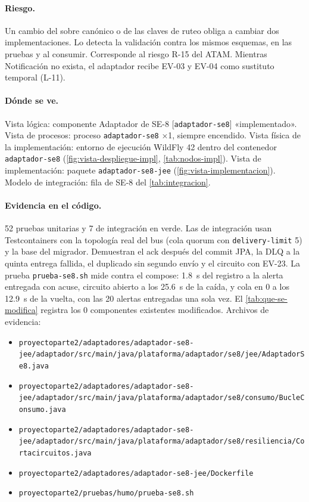 \paragraph{Riesgo.} Un cambio del sobre canónico o de las claves de ruteo obliga a cambiar dos implementaciones. Lo detecta la validación contra los mismos esquemas, en las pruebas y al consumir. Corresponde al riesgo R-15 del ATAM.
Mientras Notificación no exista, el adaptador recibe EV-03 y EV-04 como sustituto temporal (L-11).

\paragraph{Dónde se ve.} Vista lógica: componente Adaptador de SE-8 [\texttt{adaptador-se8}] «implementado».
Vista de procesos: proceso \texttt{adaptador-se8} ×1, siempre encendido.
Vista física de la implementación: entorno de ejecución WildFly 42 dentro del contenedor \texttt{adaptador-se8} (\cref{fig:vista-despliegue-impl}, \cref{tab:nodos-impl}).
Vista de implementación: paquete \texttt{adaptador-\br{}se8-\br{}jee} (\cref{fig:vista-implementacion}).
Modelo de integración: fila de SE-8 del \cref{tab:integracion}.

\paragraph{Evidencia en el código.} 52 pruebas unitarias y 7 de integración en verde. Las de integración usan Testcontainers con la topología real del bus (cola quorum con \texttt{delivery-limit} 5) y la base del migrador. Demuestran el ack después del commit JPA, la DLQ a la quinta entrega fallida, el duplicado sin segundo envío y el circuito con EV-23.
La prueba \texttt{prueba-se8.sh} mide contra el compose: \qty{1,8}{\second} del registro a la alerta entregada con acuse, circuito abierto a los \qty{25,6}{\second} de la caída, y cola en 0 a los \qty{12,9}{\second} de la vuelta, con las 20 alertas entregadas una sola vez.
El \cref{tab:que-se-modifica} registra los 0 componentes existentes modificados.
Archivos de evidencia:
{\raggedright
\begin{itemize}
  \item \texttt{proyectoparte2/\br{}adaptadores/\br{}adaptador-se8-jee/\br{}adaptador/\br{}src/\br{}main/\br{}java/\br{}plataforma/\br{}adaptador/\br{}se8/\br{}jee/\br{}AdaptadorSe8.java}
  \item \texttt{proyectoparte2/\br{}adaptadores/\br{}adaptador-se8-jee/\br{}adaptador/\br{}src/\br{}main/\br{}java/\br{}plataforma/\br{}adaptador/\br{}se8/\br{}consumo/\br{}BucleConsumo.java}
  \item \texttt{proyectoparte2/\br{}adaptadores/\br{}adaptador-se8-jee/\br{}adaptador/\br{}src/\br{}main/\br{}java/\br{}plataforma/\br{}adaptador/\br{}se8/\br{}resiliencia/\br{}Cortacircuitos.java}
  \item \texttt{proyectoparte2/\br{}adaptadores/\br{}adaptador-se8-jee/\br{}Dockerfile}
  \item \texttt{proyectoparte2/\br{}pruebas/\br{}humo/\br{}prueba-se8.sh}
\end{itemize}
\par}

